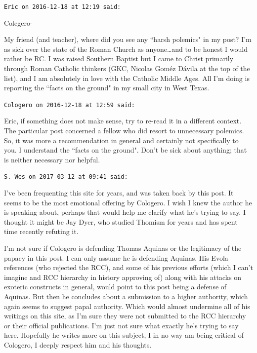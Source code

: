\begin{footnotesize}
\begin{sffamily}
\texttt{Eric on 2016-12-18 at 12:19 said: }

Colegero- 

My friend (and teacher), where did you see any ``harsh polemics" in my post? I'm as sick over the state of the Roman Church as anyone…and to be honest I would rather be RC. I was raised Southern Baptist but I came to Christ primarily through Roman Catholic thinkers (GKC, Nicolas Goméz Dávila at the top of the list), and I am absolutely in love with the Catholic Middle Ages. All I'm doing is reporting the ``facts on the ground" in my small city in West Texas.


\hfill

\texttt{Cologero on 2016-12-18 at 12:59 said: }

Eric, if something does not make sense, try to re-read it in a different context. The particular post concerned a fellow who did resort to unnecessary polemics. So, it was more a recommendation in general and certainly not specifically to you. I understand the ``facts on the ground". Don't be sick about anything; that is neither necessary nor helpful.


\hfill

\texttt{S. Wes on 2017-03-12 at 09:41 said: }

I've been frequenting this site for years, and was taken back by this post. It seems to be the most emotional offering by Cologero. I wish I knew the author he is speaking about, perhaps that would help me clarify what he's trying to say. I thought it might be Jay Dyer, who studied Thomism for years and has spent time recently refuting it.

I'm not sure if Cologero is defending Thomas Aquinas or the legitimacy of the papacy in this post. I can only assume he is defending Aquinas. His Evola references (who rejected the RCC), and some of his previous efforts (which I can't imagine and RCC hierarchy in history approving of) along with his attacks on exoteric constructs in general, would point to this post being a defense of Aquinas. But then he concludes about a submission to a higher authority, which again seems to suggest papal authority. Which would almost undermine all of his writings on this site, as I'm sure they were not submitted to the RCC hierarchy or their official publications. I'm just not sure what exactly he's trying to say here. Hopefully he writes more on this subject, I in no way am being critical of Cologero, I deeply respect him and his thoughts.


\hfill


\end{sffamily}
\end{footnotesize}
